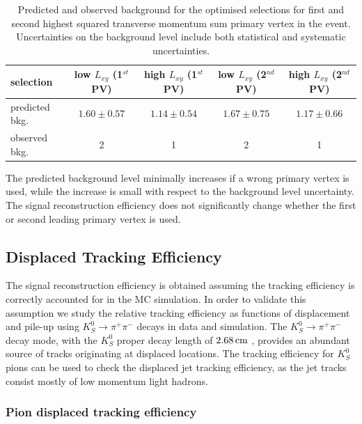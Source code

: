\begin{table}[htbp]
\caption{Predicted and observed background for the optimised selections for first and second highest squared transverse momentum sum primary vertex in the event. Uncertainties on the background level include both statistical
and systematic uncertainties. \label{tab:wrongvtx}}
\begin{tabular}{lcccc}
\hline
selection & low $L_{xy}$ (1$^{st}$ PV) & high $L_{xy}$ (1$^{st}$ PV) & low $L_{xy}$ (2$^{nd}$ PV) & high $L_{xy}$ (2$^{nd}$ PV)\\
\hline
predicted bkg. & $1.60\pm0.57$ & $1.14\pm0.54$ & $1.67\pm0.75$ & $1.17\pm0.66$ \\
observed bkg. & 2 & 1 & 2 & 1 \\ 
\hline
\end{tabular}
\end{table}

The predicted background level minimally increases if a wrong primary vertex is used, while the increase is small
with respect to the background level uncertainty. The signal reconstruction efficiency 
does not significantly change whether the first or second leading primary vertex is used.

\subsection{Displaced Tracking Efficiency}

The signal reconstruction efficiency is obtained assuming the tracking efficiency is correctly 
accounted for in the MC simulation. In order to validate this assumption we study
the relative tracking efficiency as functions of displacement and pile-up using
$K^0_S\rightarrow\pi^+\pi^-$ decays in data and simulation.
The $K^0_S\rightarrow\pi^+\pi^-$ decay mode, with the $K^0_S$ proper decay length of $2.68 \,\text{cm}$
 \cite{Beringer:1900zz}, provides an abundant source of tracks originating
at displaced locations. 
The tracking efficiency for $K^0_S$ pions can be used to check the displaced jet tracking efficiency, 
as the jet tracks consist mostly of low momentum light hadrons. 

\subsubsection{Pion displaced tracking efficiency}
\label{subsubsec:pitrkeff}

